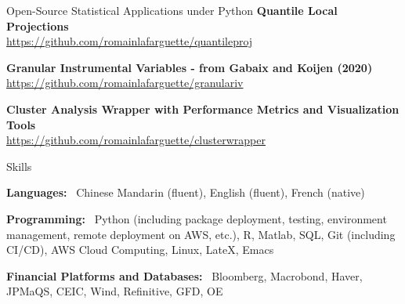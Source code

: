 \documentclass[usegeometry, 10pt, a4paper]{cv} %
\newcommand{\activite}[1]{\textbf{#1}\ }
\begin{document}
\begin{rubriquetableau}[0.95\textwidth]{Open-Source Statistical Applications under Python}
\small
\activite{Quantile Local Projections} \\
\hspace{0.6cm} \small{\url{https://github.com/romainlafarguette/quantileproj}}
\vspace{0.4cm} 

\small
\activite{Granular Instrumental Variables - from Gabaix and Koijen (2020)} \\
\hspace{0.6cm} \small{\url{https://github.com/romainlafarguette/granulariv}}
\vspace{0.4cm} 

\small
\activite{Cluster Analysis Wrapper with Performance Metrics and Visualization Tools} \\
\hspace{0.6cm} \small{\url{https://github.com/romainlafarguette/clusterwrapper}}
\vspace{0.4cm} 

\end{rubriquetableau}

\begin{rubriquetableau}[0.95\textwidth]{Skills}\\
  \vspace{-0.5cm}

\activite{Languages:} Chinese Mandarin (fluent), English (fluent), French (native)\\

  \vspace{0.4cm}

\activite{Programming:} Python (including package deployment, testing, environment management, remote deployment on AWS, etc.), \textsf{R}, Matlab, SQL, Git (including CI/CD), AWS Cloud Computing, Linux, LateX, Emacs \\

  \vspace{0.4cm}

\activite{Financial Platforms and Databases:} Bloomberg, Macrobond, Haver, JPMaQS, CEIC, Wind, Refinitive, GFD, OE

\end{rubriquetableau}


\end{document}
